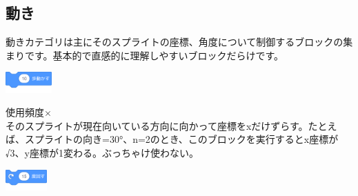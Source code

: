 \documentclass[b5paper,10pt]{jsarticle}
\begin{document}
\begin{multicols*}{3}
\subsection{動き}
動きカテゴリは主にそのスプライトの座標、角度について制御するブロックの集まりです。基本的で直感的に理解しやすいブロックだらけです。

\begin{itembox}{1}
\includegraphics[height=8mm]{images/motion_1.png}
\end{itembox}
使用頻度×\\
そのスプライトが現在向いている方向に向かって座標をxだけずらす。たとえば、スプライトの向き=30°、n=2のとき、このブロックを実行するとx座標が√3、y座標が1変わる。ぶっちゃけ使わない。
\begin{itembox}{2}
\includegraphics[height=8mm]{images/motion_2.png}


\end{itembox}
\end{multicols*}
\end{document}
